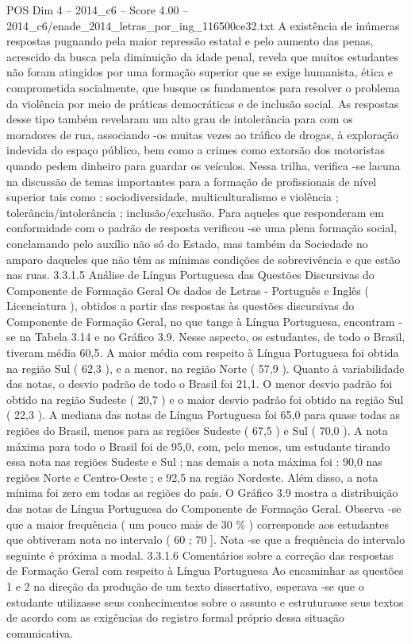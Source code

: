 \begin{textsample}{POS Dim 4 – 2014\_c6 – Score 4.00 – 2014\_c6/enade\_2014\_letras\_por\_ing\_116500ce32.txt}
A existência de inúmeras respostas pugnando pela maior repressão estatal e pelo aumento das penas, acrescido da busca pela diminuição da idade penal, revela que muitos estudantes não foram atingidos por uma formação superior que se exige humanista, ética e comprometida socialmente, que busque os fundamentos para resolver o problema da violência por meio de práticas democráticas e de inclusão social.
As respostas desse tipo também revelaram um alto grau de intolerância para com os moradores de rua, associando -os muitas vezes ao tráfico de drogas, à exploração indevida do espaço público, bem como a crimes como extorsão dos motoristas quando pedem dinheiro para guardar os veículos.
Nessa trilha, verifica -se lacuna na discussão de temas importantes para a formação de profissionais de nível superior tais como : sociodiversidade, multiculturalismo e violência ; tolerância/intolerância ; inclusão/exclusão.
Para aqueles que responderam em conformidade com o padrão de resposta verificou -se uma plena formação social, conclamando pelo auxílio não só do Estado, mas também da Sociedade no amparo daqueles que não têm as mínimas condições de sobrevivência e que estão nas ruas. 3.3.1.5 Análise de Língua Portuguesa das Questões Discursivas do Componente de Formação Geral Os dados de Letras - Português e Inglês ( Licenciatura ), obtidos a partir das respostas às questões discursivas do Componente de Formação Geral, no que tange à Língua Portuguesa, encontram -se na Tabela 3.14 e no Gráfico 3.9.
Nesse aspecto, os estudantes, de todo o Brasil, tiveram média 60,5.
A maior média com respeito à Língua Portuguesa foi obtida na região Sul ( 62,3 ), e a menor, na região Norte ( 57,9 ).
Quanto à variabilidade das notas, o desvio padrão de todo o Brasil foi 21,1.
O menor desvio padrão foi obtido na região Sudeste ( 20,7 ) e o maior desvio padrão foi obtido na região Sul ( 22,3 ).
A mediana das notas de Língua Portuguesa foi 65,0 para quase todas as regiões do Brasil, menos para as regiões Sudeste ( 67,5 ) e Sul ( 70,0 ).
A nota máxima para todo o Brasil foi de 95,0, com, pelo menos, um estudante tirando essa nota nas regiões Sudeste e Sul ; nas demais a nota máxima foi : 90,0 nas regiões Norte e Centro-Oeste ; e 92,5 na região Nordeste.
Além disso, a nota mínima foi zero em todas as regiões do país.
O Gráfico 3.9 mostra a distribuição das notas de Língua Portuguesa do Componente de Formação Geral.
Observa -se que a maior frequência ( um pouco mais de 30 \% ) corresponde aos estudantes que obtiveram nota no intervalo ( 60 ; 70 ].
Nota -se que a frequência do intervalo seguinte é próxima a modal. 3.3.1.6 Comentários sobre a correção das respostas de Formação Geral com respeito à Língua Portuguesa Ao encaminhar as questões 1 e 2 na direção da produção de um texto dissertativo, esperava -se que o estudante utilizasse seus conhecimentos sobre o assunto e estruturasse seus textos de acordo com as exigências do registro formal próprio dessa situação comunicativa.

\end{textsample}
